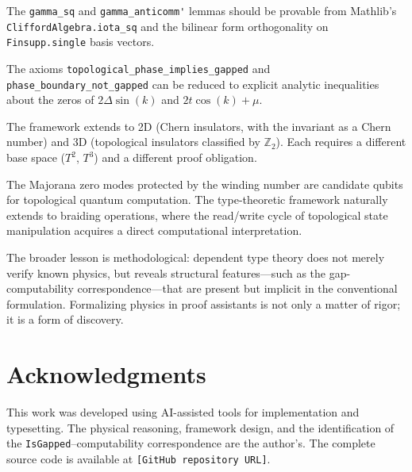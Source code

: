 \documentclass[11pt,a4paper]{article}
\newcommand{\lean}[1]{\lstinline[language=Lean4]{#1}}
\begin{document}
\begin{description}[leftmargin=2em]
    \item[Closing the sorry lemmas.] The \lean{gamma_sq} and \lean{gamma_anticomm'} lemmas should be provable from Mathlib's \lean{CliffordAlgebra.iota_sq} and the bilinear form orthogonality on \lean{Finsupp.single} basis vectors.
    
    \item[Reducing the physical axioms.] The axioms \lean{topological_phase_implies_gapped} and \lean{phase_boundary_not_gapped} can be reduced to explicit analytic inequalities about the zeros of $2\Delta \sin(k)$ and $2t\cos(k) + \mu$.
    
    \item[Higher-dimensional generalization.] The framework extends to 2D (Chern insulators, with the invariant as a Chern number) and 3D (topological insulators classified by $\mathbb{Z}_2$). Each requires a different base space ($T^2$, $T^3$) and a different proof obligation.
    
    \item[Connection to topological quantum computing.] The Majorana zero modes protected by the winding number are candidate qubits for topological quantum computation. The type-theoretic framework naturally extends to braiding operations, where the read/write cycle of topological state manipulation acquires a direct computational interpretation.
\end{description}

The broader lesson is methodological: dependent type theory does not merely verify known physics, but reveals structural features---such as the gap-computability correspondence---that are present but implicit in the conventional formulation. Formalizing physics in proof assistants is not only a matter of rigor; it is a form of discovery.

\section*{Acknowledgments}

This work was developed using AI-assisted tools for implementation and typesetting. The physical reasoning, framework design, and the identification of the \lean{IsGapped}--computability correspondence are the author's. The complete source code is available at \texttt{[GitHub repository URL]}.
\end{document}
